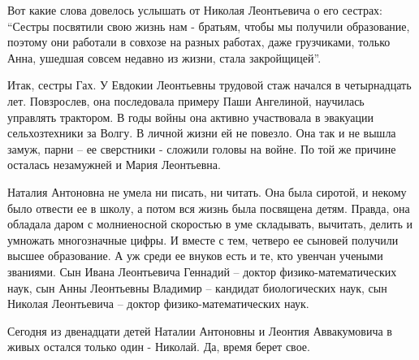 Вот какие слова довелось услышать от Николая Леонтьевича о его сестрах: \enquote{Сестры
посвятили свою жизнь нам - братьям, чтобы мы получили образование, поэтому они
работали в совхозе на разных работах, даже грузчиками, только Анна, ушедшая
совсем недавно из жизни, стала закройщицей}.

Итак, сестры Гах. У Евдокии Леонтьевны трудовой стаж начался в четырнадцать
лет. Повзрослев, она последовала примеру Паши Ангелиной, научилась управлять
трактором. В годы войны она активно участвовала в эвакуации сельхозтехники за
Волгу. В личной жизни ей не повезло. Она так и не вышла замуж, парни – ее
сверстники - сложили головы на войне. По той же причине осталась незамужней и
Мария Леонтьевна.

Наталия Антоновна не умела ни писать, ни читать. Она была сиротой, и некому
было отвести ее в школу, а потом вся жизнь была посвящена детям. Правда, она
обладала даром с молниеносной скоростью в уме складывать, вычитать, делить и
умножать многозначные цифры. И вместе с тем, четверо ее сыновей получили высшее
образование. А уж среди ее внуков есть и те, кто увенчан учеными званиями. Сын
Ивана Леонтьевича Геннадий – доктор физико-математических наук, сын Анны
Леонтьевны  Владимир – кандидат биологических наук, сын Николая Леонтьевича –
доктор физико-математических наук.

Сегодня из двенадцати детей Наталии Антоновны и Леонтия Аввакумовича в живых
остался только один  - Николай. Да, время берет свое.
